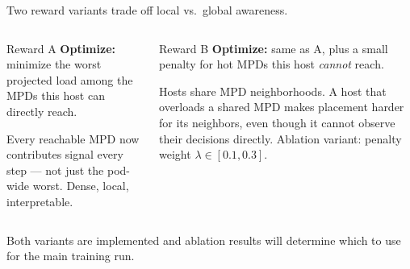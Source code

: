 \documentclass[11pt,aspectratio=43]{beamer}
\begin{document}
\begin{frame}{Two reward variants trade off local vs.\ global awareness.}

  \vspace{0.4em}

  \begin{columns}[T,onlytextwidth]
      \begin{block}{Reward A}
        \textbf{Optimize:} minimize the worst projected load among
        the MPDs this host can directly reach.

        \vspace{0.5em}
        Every reachable MPD now contributes signal every step ---
        not just the pod-wide worst.
        Dense, local, interpretable.
      \end{block}

      \begin{block}{Reward B}
        \textbf{Optimize:} same as A, plus a small penalty for
        hot MPDs this host \emph{cannot} reach.

        \vspace{0.5em}
        Hosts share MPD neighborhoods.
        A host that overloads a shared MPD makes placement harder
        for its neighbors, even though it cannot observe their
        decisions directly.
        Ablation variant: penalty weight $\lambda \in [0.1, 0.3]$.
      \end{block}
  \end{columns}

  \vspace{0.8em}

  \begin{center}
    \small
    Both variants are implemented and ablation results will determine which to use for the main training run.
  \end{center}

\end{frame}

\end{document}
